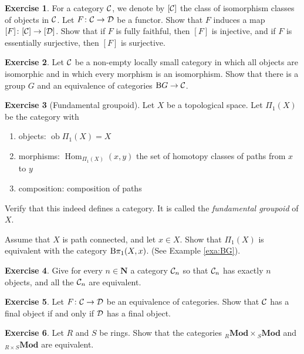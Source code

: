 \documentclass[11pt]{amsbook}
\DeclareMathOperator\Hom{Hom}
\DeclareMathOperator\Mod{{\bf{Mod}}}
\DeclareMathOperator\ob{ob}
\def\bN{{\mathbf{N}}}
\def\Mod{\mathbf{Mod}}
\theoremstyle{plain}
\theoremstyle{definition}
\newtheorem{exercise}{Exercise}
\begin{document}
\begin{exercise}
For a category ${\mathcal{C}}$, we denote by $[{\mathcal{C}}]$ the class of isomorphism classes of objects in ${\mathcal{C}}$. 
Let $F\colon {\mathcal{C}} \to {\mathcal{D}}$ be a functor. Show that $F$ induces a map $[F]\colon [{\mathcal{C}}] \to [{\mathcal{D}}]$. Show that if $F$ is fully faithful, then $[F]$ is injective, and if $F$ is essentially surjective, then $[F]$ is surjective.
\end{exercise}

\begin{exercise}
Let ${\mathcal{C}}$ be a non-empty locally small category in which all objects are isomorphic and in which every morphism is an isomorphism. Show that there is a group $G$ and an equivalence of categories ${\mathrm B} G \to {\mathcal{C}}$.
\end{exercise}


\begin{exercise}[Fundamental groupoid]
Let $X$ be a topological space. Let $\Pi_1(X)$  be the category with
\begin{enumerate}
\item objects: $\ob \Pi_1(X) = X$ 
\item morphisms: $\Hom_{\Pi_1(X)}(x,y)$ the set of homotopy classes of paths from $x$ to $y$
\item composition: composition of paths
\end{enumerate}
Verify that this indeed defines a category. It is called the \emph{fundamental groupoid} of $X$.

Assume that $X$ is path connected, and let $x\in X$. Show that $\Pi_1(X)$ is equivalent with the category ${\mathrm B} \pi_1(X,x)$. (See Example \ref{exa:BG}).
\end{exercise}



\begin{exercise}
Give for every $n\in \bN$ a category ${\mathcal{C}}_n$ so that ${\mathcal{C}}_n$ has exactly $n$ objects, and all the ${\mathcal{C}}_n$ are equivalent.
\end{exercise}


\begin{exercise} \label{exc:equivalence-final}
Let $F\colon {\mathcal{C}} \to {\mathcal{D}}$ be an equivalence of categories. Show that ${\mathcal{C}}$ has a final object if and only if ${\mathcal{D}}$ has a final object.
\end{exercise}


\begin{exercise}
Let $R$ and $S$ be rings. Show that the categories ${}_R\Mod\times {}_S\Mod$ and ${}_{R\times S}\Mod$ are equivalent.
\end{exercise}
\end{document}
